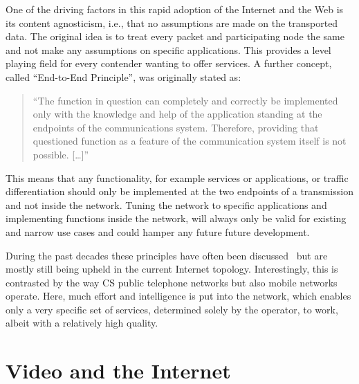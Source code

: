 One of the driving factors in this rapid adoption of the Internet and the Web is its content agnosticism, i.e., that no assumptions are made on the transported data. The original idea is to treat every packet and participating node the same and not make any assumptions on specific applications. This provides a level playing field for every contender wanting to offer services. A further concept, called ``End-to-End Principle'', was originally stated as:

\begin{quote}
``The function in question can completely and correctly be implemented only with the knowledge and help of the application standing at the endpoints of the communications system. Therefore, providing that questioned function as a feature of the communication system itself is not possible. [\ldots]''~\cite{saltzer1984end2end}
\end{quote}

This means that any functionality, for example services or applications, or traffic differentiation should only be implemented at the two endpoints of a transmission and not inside the network. Tuning the network to specific applications and implementing functions inside the network, will always only be valid for existing and narrow use cases and could hamper any future future development.

During the past decades these principles have often been discussed~\cite{bhattacharjee1997active, blumenthal2001rethinking, isenberg1997rise, lemley2000end} but are mostly still being upheld in the current Internet topology. Interestingly, this is contrasted by the way \gls{CS} public telephone networks but also mobile networks operate. Here, much effort and intelligence is put into the network, which enables only a very specific set of services, determined solely by the operator, to work, albeit with a relatively high quality.


\section{Video and the Internet}


